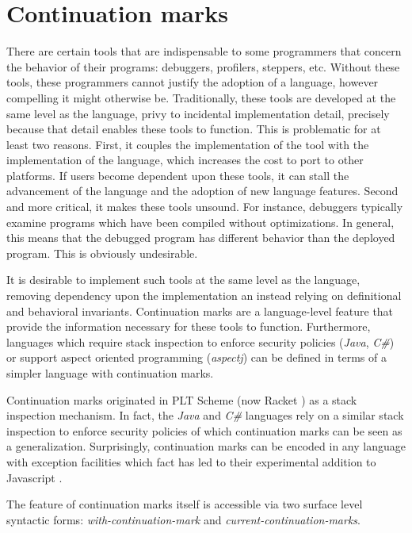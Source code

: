 \documentclass[ms,electronic,twosidetoc,letterpaper,chaptercenter,parttop]{byumsphd}
\begin{document}
\chapter{Continuation marks}

There are certain tools that are indispensable to some programmers that concern the
behavior of their programs: debuggers, profilers, steppers, etc. Without these tools,
these programmers cannot justify the adoption of a language, however compelling it might
otherwise be. Traditionally, these tools are developed at the same level as the 
language, privy to incidental implementation detail, precisely because that detail 
enables these tools to function. This is problematic for at least two reasons. First, 
it couples the implementation of the tool with the implementation of the language, which
increases the cost to port to other platforms. If users become dependent upon these tools,
it can stall the advancement of the language and the adoption of new language features.
Second and more critical, it makes these tools unsound. For instance, debuggers typically
examine programs which have been compiled without optimizations. In general, this means 
that the debugged program has different behavior than the deployed program. This is 
obviously undesirable.

It is desirable to implement such tools at the same level as the language, removing
dependency upon the implementation an instead relying on definitional and behavioral
invariants. Continuation marks are a language-level feature that provide the information
necessary for these tools to function. Furthermore, languages which require stack
inspection to enforce security policies (\emph{Java}, \emph{C\#}) or support aspect
oriented programming (\emph{aspectj}) can be defined in terms of a simpler language with
continuation marks.

Continuation marks originated in PLT Scheme (now Racket \cite{plt-tr1}) as a stack 
inspection mechanism. In fact, the \emph{Java} and \emph{C\#} languages rely on a similar 
stack inspection to enforce security policies of which continuation marks can be seen as 
a generalization. Surprisingly, continuation marks can be encoded in any language with 
exception facilities \cite{pettyjohn2005continuations} which fact has led to their 
experimental addition to Javascript \cite{clements2008implementing}.

The feature of continuation marks itself is accessible via two surface level syntactic
forms: \emph{with-continuation-mark} and \emph{current-continuation-marks}.
\end{document}
